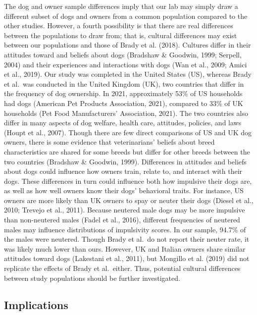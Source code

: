 \documentclass[
  pub,floatsintext]{apa6}
\begin{document}
The dog and owner sample differences imply that our lab may simply draw a different subset of dogs and owners from a common population compared to the other studies. However, a fourth possibility is that there are real differences between the populations to draw from; that is, cultural differences may exist between our populations and those of Brady et al. (2018). Cultures differ in their attitudes toward and beliefs about dogs (Bradshaw \& Goodwin, 1999; Serpell, 2004) and their experiences and interactions with dogs (Wan et al., 2009; Amici et al., 2019). Our study was completed in the United States (US), whereas Brady et al.~was conducted in the United Kingdom (UK), two countries that differ in the frequency of dog ownership. In 2021, approximately 53\% of US households had dogs (American Pet Products Association, 2021), compared to 33\% of UK households (Pet Food Manufacturers' Association, 2021). The two countries also differ in many aspects of dog welfare, health care, attitudes, policies, and laws (Houpt et al., 2007). Though there are few direct comparisons of US and UK dog owners, there is some evidence that veterinarians' beliefs about breed characteristics are shared for some breeds but differ for other breeds between the two countries (Bradshaw \& Goodwin, 1999). Differences in attitudes and beliefs about dogs could influence how owners train, relate to, and interact with their dogs. These differences in turn could influence both how impulsive their dogs are, as well as how well owners know their dogs' behavioral traits. For instance, US owners are more likely than UK owners to spay or neuter their dogs (Diesel et al., 2010; Trevejo et al., 2011). Because neutered male dogs may be more impulsive than non-neutered males (Fadel et al., 2016), different frequencies of neutered males may influence distributions of impulsivity scores. In our sample, 94.7\% of the males were neutered. Though Brady et al.~do not report their neuter rate, it was likely much lower than ours. However, UK and Italian owners share similar attitudes toward dogs (Lakestani et al., 2011), but Mongillo et al. (2019) did not replicate the effects of Brady et al.~either. Thus, potential cultural differences between study populations should be further investigated.

\hypertarget{implications}{%
\subsection{Implications}\label{implications}}
\end{document}
